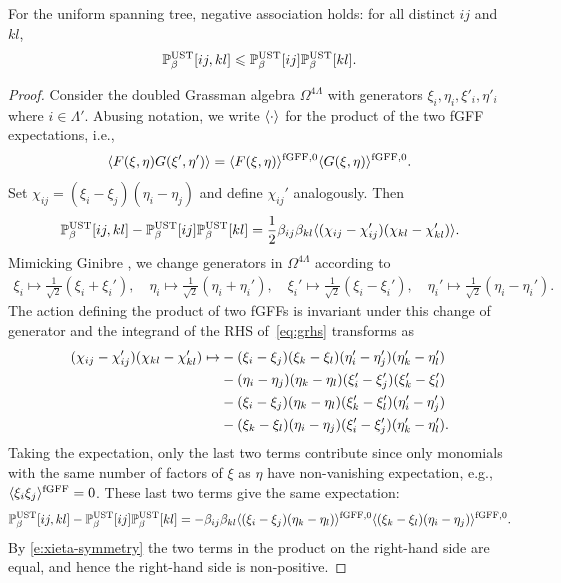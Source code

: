 \documentclass[11pt]{amsart}
\numberwithin{equation}{section}
\numberwithin{theorem}{section}
\begin{document}
\begin{proposition}
  For the uniform spanning tree, negative association holds:
  for all distinct $ij$ and $kl$,
  \begin{equation}
    \P_\beta^{\rm UST}[ij,kl] \leq \P_\beta^{\rm UST}[ij]\P_\beta^{\rm UST}[kl].
  \end{equation}
\end{proposition}
\begin{proof}
  Consider the doubled Grassman algebra $\Omega^{4\Lambda}$ with generators $\xi_i,\eta_i,\xi'_i,\eta'_i$ where $i \in \Lambda'$. Abusing notation, we write $\avg{\cdot}$
  for the product of the two fGFF expectations, i.e.,
  \begin{equation}
    \avg{F(\xi,\eta)G(\xi',\eta')}
    =    \avg{F(\xi,\eta)}^{\rm fGFF,0}\avg{G(\xi,\eta)}^{\rm fGFF,0}.
  \end{equation}
  Set $\chi_{ij} = (\xi_i-\xi_j)(\eta_i-\eta_j)$ and define $\chi_{ij}'$ analogously. Then
  \begin{equation}
    \label{eq:grhs}
    \P_\beta^{\rm UST}[ij,kl] - \P_\beta^{\rm UST}[ij]\P_\beta^{\rm UST}[kl]
    = \frac12 \beta_{ij}\beta_{kl} \avg{(\chi_{ij}-\chi_{ij}')(\chi_{kl}-\chi_{kl}')}.
  \end{equation}
  Mimicking Ginibre \cite{MR0269252}, we change generators in $\Omega^{4\Lambda}$
  according to
  \begin{align}
    \xi_i \mapsto \frac{1}{\sqrt{2}}(\xi_i+\xi_i'),\quad
    \eta_i \mapsto \frac{1}{\sqrt{2}}(\eta_i+\eta_i'),\quad
    \xi_i' \mapsto \frac{1}{\sqrt{2}}(\xi_i-\xi_i'),\quad
    \eta_i' \mapsto \frac{1}{\sqrt{2}}(\eta_i-\eta_i').
  \end{align}
  The action defining the product of two fGFFs is invariant
  under this change of generator and the integrand of the RHS
  of~\eqref{eq:grhs} transforms as
  \begin{alignat}{1}
    (\chi_{ij}-\chi_{ij}')(\chi_{kl}-\chi_{kl}')
    \mapsto
    & - (\xi_i-\xi_j)(\xi_k-\xi_l)(\eta_i'-\eta_j')(\eta_k'-\eta_l')
      \nnb
    & - (\eta_i-\eta_j)(\eta_k-\eta_l)(\xi_i'-\xi_j')(\xi_k'-\xi_l')
    \nnb
    & - (\xi_i-\xi_j)(\eta_k-\eta_l)(\xi_k'-\xi_l')(\eta_i'-\eta_j')
    \nnb
    & - (\xi_k-\xi_l)(\eta_i-\eta_j)(\xi_i'-\xi_j')(\eta_k'-\eta_l').
  \end{alignat}
  Taking the expectation, only the last two terms contribute since only monomials
  with the same number of factors of $\xi$ as $\eta$ have non-vanishing expectation, e.g., $\avg{\xi_i\xi_j}^{\rm fGFF}=0$. These last two terms give the same expectation:
  \begin{equation} \label{e:UST-deficit}
    \P_\beta^{\rm UST}[ij,kl] - \P_\beta^{\rm UST}[ij]\P_\beta^{\rm UST}[kl]
    = - \beta_{ij}\beta_{kl}\avg{(\xi_i-\xi_j)(\eta_k-\eta_l)}^{\rm fGFF,0}\avg{(\xi_k-\xi_l)(\eta_i-\eta_j)}^{\rm fGFF,0}.
  \end{equation}
  By \eqref{e:xieta-symmetry}
  the two terms in the product on the right-hand side are equal, and 
  hence the right-hand side is non-positive.
\end{proof}
\end{document}

